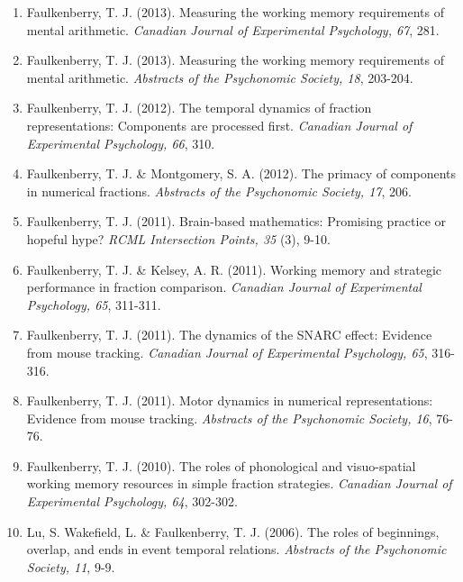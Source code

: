 \documentclass[article,10pt]{article}
\begin{document}
\begin{enumerate}
\item Faulkenberry, T. J. (2013). Measuring the working memory requirements of mental arithmetic. \emph{Canadian Journal of Experimental Psychology, 67}, 281.
\item Faulkenberry, T. J. (2013). Measuring the working memory requirements of mental arithmetic. \emph{Abstracts of the Psychonomic Society, 18}, 203-204.
\item Faulkenberry, T. J. (2012). The temporal dynamics of fraction representations: Components are processed first. \emph{Canadian Journal of Experimental Psychology, 66}, 310.
\item Faulkenberry, T. J. \& Montgomery, S. A. (2012). The primacy of components in numerical fractions. \emph{Abstracts of the Psychonomic Society, 17}, 206.
\item Faulkenberry, T. J. (2011). Brain-based mathematics: Promising practice or hopeful hype? \emph{RCML Intersection Points, 35} (3), 9-10.
\item Faulkenberry, T. J. \& Kelsey, A. R. (2011). Working memory and strategic performance in fraction comparison. \emph{Canadian Journal of Experimental Psychology, 65}, 311-311.
\item Faulkenberry, T. J. (2011). The dynamics of the SNARC effect: Evidence from mouse tracking. \emph{Canadian Journal of Experimental Psychology, 65}, 316-316.
\item Faulkenberry, T. J. (2011). Motor dynamics in numerical representations: Evidence from mouse tracking. \emph{Abstracts of the Psychonomic Society, 16}, 76-76.
\item Faulkenberry, T. J. (2010). The roles of phonological and visuo-spatial working memory resources in simple fraction strategies. \emph{Canadian Journal of Experimental Psychology, 64}, 302-302.
\item Lu, S. Wakefield, L. \& Faulkenberry, T. J. (2006). The roles of beginnings, overlap, and ends in event temporal relations. \emph{Abstracts of the Psychonomic Society, 11}, 9-9.
\end{enumerate}
\end{document}
